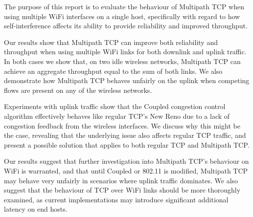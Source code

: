 \documentclass[12pt,a4paper]{article}
\begin{document}
The purpose of this report is to evaluate the behaviour of Multipath TCP when
using multiple WiFi interfaces on a single host, specifically with regard to how
self-interference affects its ability to provide reliability and improved
throughput.

Our results show that Multipath TCP can improve both reliability and throughput
when using multiple WiFi links for both downlink and uplink traffic. In both
cases we show that, on two idle wireless networks, Multipath TCP can achieve an
aggregate throughput equal to the sum of both links. We also demonstrate how
Multipath TCP behaves unfairly on the uplink when competing flows are present on
any of the wireless networks.

Experiments with uplink traffic show that the Coupled congestion control
algorithm effectively behaves like regular TCP's New Reno due to a lack of
congestion feedback from the wireless interfaces. We discuss why this might be
the case, revealing that the underlying issue also affects regular TCP traffic,
and present a possible solution that applies to both regular TCP and Multipath
TCP.

Our results suggest that further investigation into Multipath TCP's behaviour on
WiFi is warranted, and that until Coupled or 802.11 is modified, Multipath TCP
may behave very unfairly in scenarios where uplink traffic dominates. We also
suggest that the behaviour of TCP over WiFi links should be more thoroughly
examined, as current implementations may introduce significant additional
latency on end hosts.
\end{document}

